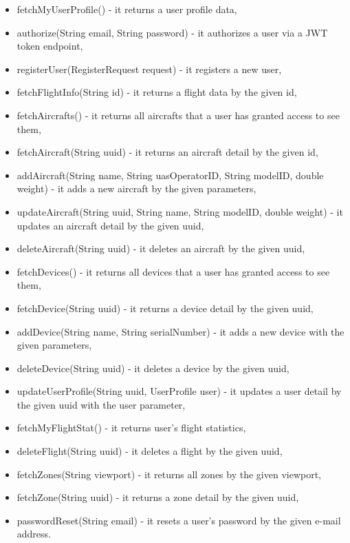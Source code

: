 \begin{itemize}
    \item fetchMyUserProfile() - it returns a user profile data,
    \item authorize(String email, String password) - it authorizes a user via a JWT token endpoint,
    \item registerUser(RegisterRequest request) - it registers a new user,
    \item fetchFlightInfo(String id) - it returns a flight data by the given id,
    \item fetchAircrafts() - it returns all aircrafts that a user has granted access to see them,
    \item fetchAircraft(String uuid) - it returns an aircraft detail by the given id,
    \item addAircraft(String name, String uasOperatorID, String modelID, double weight) - it adds a new aircraft by the given parameters,
    \item updateAircraft(String uuid, String name, String modelID, double weight) - it updates an aircraft detail by the given uuid,
    \item deleteAircraft(String uuid) - it deletes an aircraft by the given uuid,
    \item fetchDevices() - it returns all devices that a user has granted access to see them,
    \item fetchDevice(String uuid) - it returns a device detail by the given uuid,
    \item addDevice(String name, String serialNumber) - it adds a new device with the given parameters,
    \item deleteDevice(String uuid) - it deletes a device by the given uuid,
    \item updateUserProfile(String uuid, UserProfile user) - it updates a user detail by the given uuid with the user parameter,
    \item fetchMyFlightStat() - it returns user's flight statistics,
    \item deleteFlight(String uuid) - it deletes a flight by the given uuid,
    \item fetchZones(String viewport) - it returns all zones by the given viewport,
    \item fetchZone(String uuid) - it returns a zone detail by the given uuid,
    \item passwordReset(String email) - it resets a user's password by the given e-mail address.
\end{itemize}

